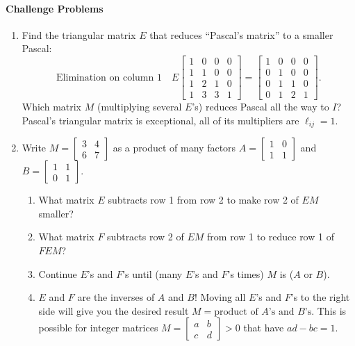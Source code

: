 \documentclass[14pt, a4paper]{article}
\begin{document}
\paragraph{Challenge Problems}
\begin{enumerate}[resume]
    \item Find the triangular matrix $E$ that reduces ``Pascal's matrix'' to a smaller Pascal:
          \[
              \text{Elimination on column 1}\quad
              E\begin{bmatrix}
                  1 & 0 & 0 & 0 \\
                  1 & 1 & 0 & 0 \\
                  1 & 2 & 1 & 0 \\
                  1 & 3 & 3 & 1
              \end{bmatrix}
              =
              \begin{bmatrix}
                  1 & 0 & 0 & 0 \\
                  0 & 1 & 0 & 0 \\
                  0 & 1 & 1 & 0 \\
                  0 & 1 & 2 & 1
              \end{bmatrix}.
          \]
          Which matrix $M$ (multiplying several $E$'s) reduces Pascal all the way to $I$? Pascal's triangular matrix is exceptional, all of its multipliers are $\ell_{ij}=1$.

    \item Write $M = \begin{bmatrix} 3 & 4 \\ 6 & 7 \end{bmatrix}$ as a product of many factors $A = \begin{bmatrix} 1 & 0 \\ 1 & 1 \end{bmatrix}$ and $B = \begin{bmatrix} 1 & 1 \\ 0 & 1 \end{bmatrix}$.
          \begin{enumerate}
              \item What matrix $E$ subtracts row 1 from row 2 to make row 2 of $EM$ smaller?
              \item What matrix $F$ subtracts row 2 of $EM$ from row 1 to reduce row 1 of $FEM$?
              \item Continue $E$'s and $F$'s until (many $E$'s and $F$'s times) $M$ is ($A$ or $B$).
              \item $E$ and $F$ are the inverses of $A$ and $B$! Moving all $E$'s and $F$'s to the right side will give you the desired result $M = \text{product of } A\text{'s and } B\text{'s}$.
                    This is possible for integer matrices $M = \begin{bmatrix} a & b \\ c & d \end{bmatrix} > 0$ that have $ad - bc = 1$.
          \end{enumerate}


\end{enumerate}
\end{document}
